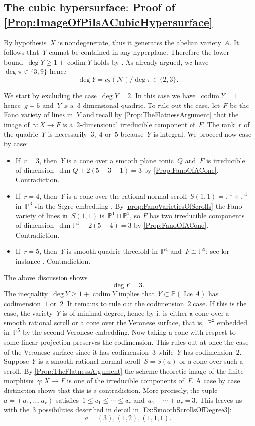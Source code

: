 \documentclass[a4paper]{amsart}
\newcommand{\bbP}{\mathbb{P}}
\newcommand{\cN}{\mathcal{N}}
\DeclareMathOperator{\Lie}{Lie}
\DeclareMathOperator{\codim}{codim}
\renewcommand{\le}{\leqslant}
\renewcommand{\ge}{\geqslant}
\theoremstyle{plain}
\theoremstyle{definition}
\numberwithin{equation}{section}
\begin{document}
\subsection{The cubic hypersurface: Proof of \cref{Prop:ImageOfPiIsACubicHypersurface}} By hypothesis~$X$ is nondegenerate, thus it generates the abelian variety~$A$. It follows that~$Y$ cannot be contained in any hyperplane. Therefore the lower bound~$\deg Y \ge 1 + \codim Y$ holds by \cite[prop. 0]{EisenbudHarrisMinimalDegree}. As already argued, we have~$\deg \pi \in \{3, 9 \}$ hence
\[ \deg Y = c_2(\cN) / \deg \pi \in \{ 2, 3\}.\]


We start by excluding the case~$\deg Y = 2$. In this case we have~$\codim Y= 1$ hence~$g = 5$ and~$Y$ is a~$3$-dimensional quadric. To rule out the case, let~$F$ be the Fano variety of lines in~$Y$ and recall by \cref{Prop:TheFlatnessArgument} that the image of~$\gamma \colon X \to F$ is a~$2$-dimensional irreducible component of~$F$. The rank~$r$ of the quadric~$Y$ is necessarily~$3$,~$4$ or~$5$ because~$Y$ is integral. We proceed now case by case:

\begin{itemize}
\item If~$r = 3$, then~$Y$ is a cone over a smooth plane conic~$Q$ and~$F$ is irreducible of dimension~$\dim Q + 2(5 - 3- 1) = 3$ by \cref{Prop:FanoOfACone}. Contradiction. \smallskip
\item If~$r = 4$, then~$Y$ is a cone over the rational normal scroll~$S(1,1) = \bbP^1 \times \bbP^1$ in~$\bbP^3$ via the Segre embedding \cite[p.~285]{HarrisAlgebraicGeometry}. By \cref{prop:FanoVarietiesOfScrolls} the Fano variety of lines in~$S(1,1)$ is~$\bbP^1 \sqcup \bbP^1$, so $F$ has two irreducible components of dimension~$\dim \bbP^1 + 2(5 - 4) = 3$ by \cref{Prop:FanoOfACone}. Contradiction. \smallskip
\item If~$r = 5$, then~$Y$ is smooth quadric threefold in~$\bbP^4$ and~$F \cong \bbP^3$; see for instance \cite[ex.~22.6]{HarrisAlgebraicGeometry}. Contradiction.
\end{itemize}
The above discussion shows
\[ \deg Y = 3.\]
The inequality~$\deg Y \ge 1 + \codim Y$ implies that~$Y \subset \bbP(\Lie A)$ has codimension~$1$ or~$2$.  It remains to rule out the codimension~$2$ case. If this is the case, the variety~$Y$ is of minimal degree, hence by \cite[th.~1]{EisenbudHarrisMinimalDegree} it is either a cone over a smooth rational scroll or a cone over the Veronese surface, that is,~$\bbP^2$ embedded in~$\bbP^5$ by the second Veronese embedding. Now taking a cone with respect to some linear projection preserves the codimension. This rules out at once the case of the Veronese surface since it has codimension~$3$ while~$Y$ has codimension~$2$. Suppose~$Y$ is a smooth rational normal scroll~$S = S(a)$ or a cone over such a scroll. By \cref{Prop:TheFlatnessArgument} the scheme-theoretic image of the finite morphism~$\gamma \colon X \to F$ is one of the irreducible components of~$F$. A case by case distinction shows that this is a contradiction. More precisely, the tuple~$a = (a_1, \dots, a_r)$ satisfies~$1 \le a_1 \le \cdots \le a_r$ and~$a_1 + \cdots + a_r = 3$. This leaves us with the~$3$ possibilities described in detail in \cref{Ex:SmoothScrollsOfDegree3}:
\[ a = (3), (1,2), (1,1,1).\]
\end{document}
